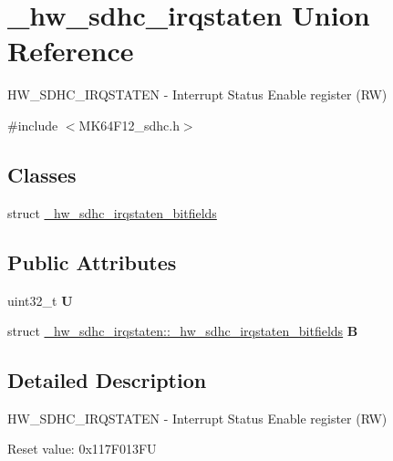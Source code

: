 \hypertarget{union__hw__sdhc__irqstaten}{}\section{\+\_\+hw\+\_\+sdhc\+\_\+irqstaten Union Reference}
\label{union__hw__sdhc__irqstaten}


H\+W\+\_\+\+S\+D\+H\+C\+\_\+\+I\+R\+Q\+S\+T\+A\+T\+EN -\/ Interrupt Status Enable register (RW)  




{\ttfamily \#include $<$M\+K64\+F12\+\_\+sdhc.\+h$>$}

\subsection*{Classes}
\begin{DoxyCompactItemize}
\item 
struct \hyperlink{struct__hw__sdhc__irqstaten_1_1__hw__sdhc__irqstaten__bitfields}{\+\_\+hw\+\_\+sdhc\+\_\+irqstaten\+\_\+bitfields}
\end{DoxyCompactItemize}
\subsection*{Public Attributes}
\begin{DoxyCompactItemize}
\item 
uint32\+\_\+t {\bfseries U}\hypertarget{union__hw__sdhc__irqstaten_a9160de479a5402165c1c12c159cb5356}{}\label{union__hw__sdhc__irqstaten_a9160de479a5402165c1c12c159cb5356}

\item 
struct \hyperlink{struct__hw__sdhc__irqstaten_1_1__hw__sdhc__irqstaten__bitfields}{\+\_\+hw\+\_\+sdhc\+\_\+irqstaten\+::\+\_\+hw\+\_\+sdhc\+\_\+irqstaten\+\_\+bitfields} {\bfseries B}\hypertarget{union__hw__sdhc__irqstaten_ac65b50255b9dcd2d4f6d5ef832e4eeb3}{}\label{union__hw__sdhc__irqstaten_ac65b50255b9dcd2d4f6d5ef832e4eeb3}

\end{DoxyCompactItemize}


\subsection{Detailed Description}
H\+W\+\_\+\+S\+D\+H\+C\+\_\+\+I\+R\+Q\+S\+T\+A\+T\+EN -\/ Interrupt Status Enable register (RW) 

Reset value\+: 0x117\+F013\+FU

